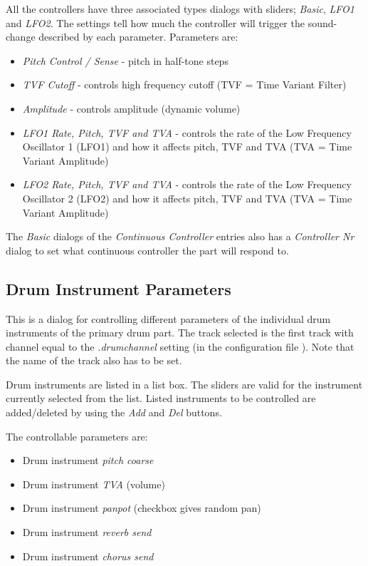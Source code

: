 \documentclass[letterpaper]{report}
\begin{document}
All the controllers have three associated types dialogs with sliders;
{\em Basic}, {\em LFO1} and {\em LFO2}.
The settings tell how much the controller will trigger the
sound-change described by each parameter. Parameters are:

\begin{itemize}
\item {\em Pitch Control / Sense} - pitch in half-tone steps
\item {\em TVF Cutoff} - controls high frequency cutoff (TVF =
Time Variant Filter)
\item {\em Amplitude} - controls amplitude (dynamic volume)
\item {\em LFO1 Rate, Pitch, TVF and TVA} - controls the rate of the Low
Frequency Oscillator 1 (LFO1) and how it affects pitch, TVF and TVA (TVA =
Time Variant Amplitude)
\item {\em LFO2 Rate, Pitch, TVF and TVA} - controls the rate of the Low
Frequency Oscillator 2 (LFO2) and how it affects pitch, TVF and TVA (TVA =
Time Variant Amplitude)
\end{itemize}

The {\em Basic} dialogs of the {\em Continuous Controller} entries also has
a {\em Controller Nr} dialog to set what continuous controller the part
will respond to.


\subsection{Drum Instrument Parameters}

This is a dialog for controlling different parameters of the individual drum
instruments of the primary drum part. The track selected is the first track
with channel equal to the {\em .drumchannel} setting (in the configuration
file ). Note that the name of the track also has to be set.

Drum instruments are listed in a list box. The sliders are valid for the
instrument currently selected from the list. Listed instruments to be
controlled are added/deleted by using the {\em Add} and {\em Del} buttons.

The controllable parameters are:

\begin{itemize}
\item Drum instrument {\em pitch coarse}
\item Drum instrument {\em TVA} (volume)
\item Drum instrument {\em panpot} (checkbox gives random pan)
\item Drum instrument {\em reverb send}
\item Drum instrument {\em chorus send}
\end{itemize}
\end{document}
